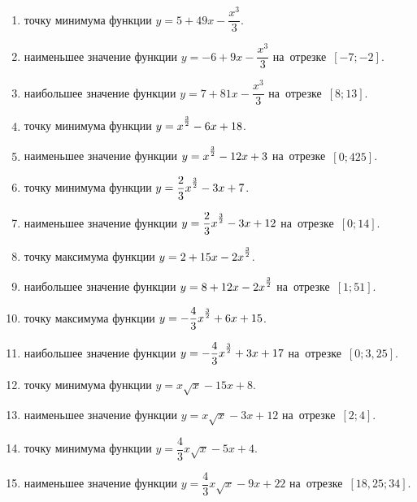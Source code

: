 \documentclass[a4paper,10pt]{article}
\begin{document}
\begin{enumerate}
\item {} точку минимума функции $y=5 +49x-\dfrac{x^3}{3}$.

\item {} наименьшее значение функции $y=-6 +9x-\dfrac{x^3}{3}$ на~отрезке~$\left[-7;-2\right]$.

\item {} наибольшее значение функции $y=7 +81x-\dfrac{x^3}{3}$ на~отрезке~$\left[8;13\right]$.

\item {} точку минимума функции $y=x\strut^{\frac{3}{2}} -6x+18$.

\item {} наименьшее значение функции $y=x\strut^{\frac{3}{2}} -12x+3$ на~отрезке~$\left[0;425\right]$.

\item {} точку минимума функции $y=\dfrac{2}{3}x\strut^{\frac{3}{2}} -3x+7$.

\item {} наименьшее значение функции $y=\dfrac{2}{3}x\strut^{\frac{3}{2}} -3x+12$ на~отрезке~$\left[0;14\right]$.

\item {} точку максимума функции $y=2+15x-2x\strut^{\frac{3}{2}}$.

\item {} наибольшее значение функции $y=8+12x-2x\strut^{\frac{3}{2}}$ на~отрезке~$\left[1;51\right]$.

\item {} точку максимума функции $y=-\dfrac{4}{3}x\strut^{\frac{3}{2}} +6x+15$.

\item {} наибольшее значение функции $y=-\dfrac{4}{3}x\strut^{\frac{3}{2}} +3x+17$ на~отрезке~$\left[0;3,25\right]$.

\item {} точку минимума функции $y=x\sqrt{x} -15x+8$.

\item {} наименьшее значение функции $y=x\sqrt{x} -3x+12$ на~отрезке~$\left[2;4\right]$.

\item {} точку минимума функции $y=\dfrac{4}{3}x\sqrt{x} -5x+4$.

\item {} наименьшее значение функции $y=\dfrac{4}{3}x\sqrt{x} -9x+22$ на~отрезке~$\left[18,25;34\right]$.


\end{enumerate}
\end{document}
